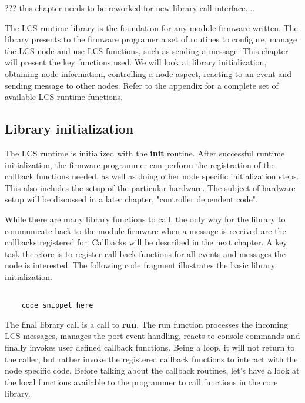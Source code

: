 ??? this chapter needs to be reworked for new library call interface....

The LCS runtime library is the foundation for any module firmware written. The library presents to the firmware programer a set of routines to configure, manage the LCS node and use LCS functions, such as sending a message. This chapter will present the key functions used. We will look at library initialization, obtaining node information, controlling a node aspect, reacting to an event and sending message to other nodes.
Refer to the appendix for a complete set of available LCS runtime functions.

\subsection{Library initialization}

The LCS runtime is initialized with the \textbf{init} routine. After successful runtime initialization, the firmware programmer can perform the registration of the callback functions needed, as well as doing other node specific initialization steps. This also includes the setup of the particular hardware. The subject of hardware setup will be discussed in a later chapter, "controller dependent code". 

While there are many library functions to call, the only way for the library to communicate back to the module firmware when a message is received are the callbacks registered for. Callbacks will be described in the next chapter. A key task therefore is to register call back functions for all events and messages the node is interested. The following code fragment illustrates the basic library initialization.

\lstset{language=c++, style=codesnippetstyle}
\begin{lstlisting}
   
    code snippet here

\end{lstlisting}
\FloatBarrier


The final library call is a call to \textbf{run}. The run function processes the incoming LCS messages, manages the port event handling, reacts to console commands and finally invokes user defined callback functions. Being a loop, it will not return to the caller, but rather invoke the registered callback functions to interact with the node specific code. Before talking about the callback routines, let's have a look at the local functions available to the  programmer to call functions in the core library.

